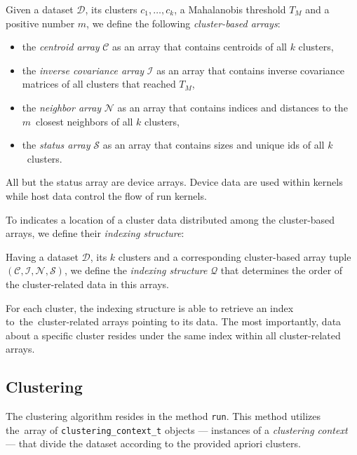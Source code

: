 \begin{defn}
	Given a dataset $\mathcal{D}$, its clusters $c_1,\dots,c_k$, a Mahalanobis threshold $T_M$ and a positive number $m$, we define the following \emph{cluster-based arrays}:
	\begin{itemize}
		\item the \emph{centroid array} $\mathcal{C}$ as an array that contains centroids of all $k$ clusters,
		\item the \emph{inverse covariance array} $\mathcal{I}$ as an array that contains inverse covariance matrices of all clusters that reached $T_M$,
		\item the \emph{neighbor array} $\mathcal{N}$ as an array that contains indices and distances to the~$m$~closest neighbors of all $k$ clusters,
		\item the \emph{status array} $\mathcal{S}$ as an array that contains sizes and unique ids of all $k$~clusters.
	\end{itemize}
	\label{def03:tuple}
\end{defn}


All but the status array are device arrays. Device data are used within kernels while host data control the flow of run kernels.  

To indicates a location of a cluster data distributed among the cluster-based arrays, we define their \emph{indexing structure}: 

\begin{defn}
	Having a dataset $\mathcal{D}$, its $k$ clusters and a corresponding cluster-based array tuple $(\mathcal{C},\mathcal{I},\mathcal{N},\mathcal{S})$, we define the \emph{indexing structure} $\mathcal{Q}$ that determines the order of the cluster-related data in this arrays.
	\label{def03:index}
\end{defn}

For each cluster, the indexing structure is able to retrieve an index to~the~clus\-ter-related arrays pointing to its data. The most importantly, data about a specific cluster resides under the same index within all cluster-related arrays.



\subsection{Clustering}
The clustering algorithm resides in the method \texttt{run}. This method utilizes the~array of \texttt{clustering\_context\_t} objects --- instances of a \emph{clustering context} --- that divide the dataset according to the provided apriori clusters.


